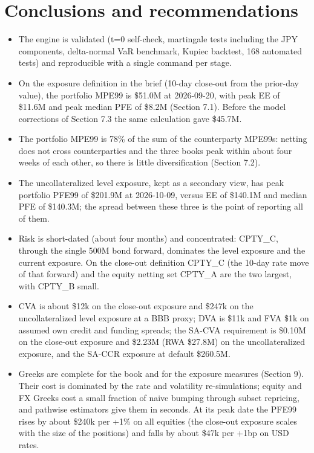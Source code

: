\documentclass[11pt,letterpaper]{article}
\begin{document}
\section{Conclusions and recommendations}
\begin{itemize}
\item The engine is validated (t=0 self-check, martingale tests including the JPY components, delta-normal VaR benchmark, Kupiec backtest, 168 automated tests) and reproducible with a single command per stage.
\item On the exposure definition in the brief (10-day close-out from the prior-day value), the portfolio MPE99 is \$51.0M at 2026-09-20, with peak EE of \$11.6M and peak median PFE of \$8.2M (Section 7.1). Before the model corrections of Section 7.3 the same calculation gave \$45.7M.
\item The portfolio MPE99 is 78\% of the sum of the counterparty MPE99s: netting does not cross counterparties and the three books peak within about four weeks of each other, so there is little diversification (Section 7.2).
\item The uncollateralized level exposure, kept as a secondary view, has peak portfolio PFE99 of \$201.9M at 2026-10-09, versus EE of \$140.1M and median PFE of \$140.3M; the spread between these three is the point of reporting all of them.
\item Risk is short-dated (about four months) and concentrated: CPTY\_C, through the single 500M bond forward, dominates the level exposure and the current exposure. On the close-out definition CPTY\_C (the 10-day rate move of that forward) and the equity netting set CPTY\_A are the two largest, with CPTY\_B small.
\item CVA is about \$12k on the close-out exposure and \$247k on the uncollateralized level exposure at a BBB proxy; DVA is \$11k and FVA \$1k on assumed own credit and funding spreads; the SA-CVA requirement is \$0.10M on the close-out exposure and \$2.23M (RWA \$27.8M) on the uncollateralized exposure, and the SA-CCR exposure at default \$260.5M.
\item Greeks are complete for the book and for the exposure measures (Section 9). Their cost is dominated by the rate and volatility re-simulations; equity and FX Greeks cost a small fraction of naive bumping through subset repricing, and pathwise estimators give them in seconds. At its peak date the PFE99 rises by about \$240k per +1\% on all equities (the close-out exposure scales with the size of the positions) and falls by about \$47k per +1bp on USD rates.

\end{itemize}
\end{document}
